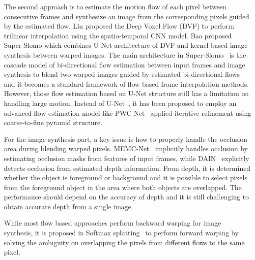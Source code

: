 \documentclass[10pt,twocolumn,letterpaper]{article}
\begin{document}
The second approach is to estimate the motion flow of each pixel between consecutive frames and synthesize an image from the corresponding pixels guided by the estimated flow. 
Liu \etal\cite{liu2017video} proposed the Deep Voxel Flow (DVF) to perform trilinear interpolation using the spatio-temporal CNN model.
Bao \etal\cite{jiang2018super} proposed Super-Slomo which combines U-Net architecture of DVF and kernel based image synthesis between warped images.
The main architecture in Super-Slomo~\cite{jiang2018super} is the cascade model of bi-directional flow estimation between input frames and image synthesis to blend two warped images guided by estimated bi-directional flows and it becomes a standard framework of flow based frame interpolation methods.
However, those flow estimation based on U-Net structure still has a limitation on handling large motion. Instead of U-Net~\cite{ronneberger2015u}, it has been proposed to employ an advanced flow estimation model like PWC-Net~\cite{sun2018pwc} applied iterative refinement using coarse-to-fine pyramid structure.

For the image synthesis part, a key issue is how to properly handle the occlusion area during blending warped pixels.
MEMC-Net~\cite{bao2019memc} implicitly handles occlusion by estimating occlusion masks from features of input frames, while DAIN~\cite{bao2019depth} explicitly detects occlusion from estimated depth information.
From depth, it is determined whether the object is foreground or background and it is possible to select pixels from the foreground object in the area where both objects are overlapped.
The performance should depend on the accuracy of depth and it is still challenging to obtain accurate depth from a single image.

While most flow based approaches perform backward warping for image synthesis, it is proposed in Softmax splatting~\cite{niklaus2020softmax} to perform forward warping by solving the ambiguity on overlapping the pixels from different flows to the same pixel. 
\end{document}
